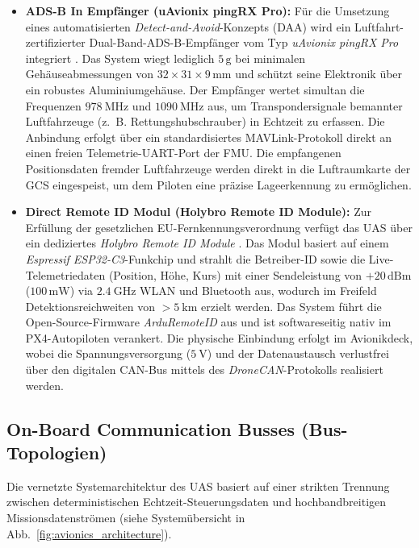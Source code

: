\begin{itemize}
    \item \textbf{ADS-B In Empfänger (uAvionix pingRX Pro):} Für die Umsetzung eines automatisierten \textit{Detect-and-Avoid}-Konzepts (DAA) wird ein Luftfahrt-zertifizierter Dual-Band-ADS-B-Empfänger vom Typ \textit{uAvionix pingRX Pro} 
    integriert \cite{uavionix_pingrx_pro}. Das System wiegt lediglich $5\,\text{g}$ bei minimalen Gehäuseabmessungen von $32 \times 31 \times 9\,\text{mm}$ und schützt seine Elektronik über ein robustes Aluminiumgehäuse. 
    Der Empfänger wertet simultan die Frequenzen $\SI{978}{\MHz}$ und $\SI{1090}{\MHz}$ aus, um Transpondersignale bemannter Luftfahrzeuge (z.~B. Rettungshubschrauber) in Echtzeit zu erfassen. Die Anbindung erfolgt über ein standardisiertes 
    MAVLink-Protokoll direkt an einen freien Telemetrie-UART-Port der FMU. Die empfangenen Positionsdaten fremder Luftfahrzeuge werden direkt in die Luftraumkarte der GCS eingespeist, um dem Piloten eine präzise Lageerkennung zu ermöglichen.
    
    \item \textbf{Direct Remote ID Modul (Holybro Remote ID Module):} Zur Erfüllung der gesetzlichen EU-Fernkennungsverordnung verfügt das UAS über ein dediziertes \textit{Holybro Remote ID Module} \cite{holybro_remote_id}. 
    Das Modul basiert auf einem \textit{Espressif ESP32-C3}-Funkchip und strahlt die Betreiber-ID sowie die Live-Telemetriedaten (Position, Höhe, Kurs) mit einer Sendeleistung von $+20\,\text{dBm}$ ($100\,\text{mW}$) via $\SI{2.4}{\GHz}$ 
    WLAN und Bluetooth aus, wodurch im Freifeld Detektionsreichweiten von $>\SI{5}{\km}$ erzielt werden. Das System führt die Open-Source-Firmware \textit{ArduRemoteID} aus und ist softwareseitig nativ im PX4-Autopiloten verankert. 
    Die physische Einbindung erfolgt im Avionikdeck, wobei die Spannungsversorgung ($\SI{5}{\V}$) und der Datenaustausch verlustfrei über den digitalen CAN-Bus mittels 
    des \textit{DroneCAN}-Protokolls realisiert werden.
\end{itemize}

\subsection{On-Board Communication Busses (Bus-Topologien)}
\label{sec:bus_topologies}

Die vernetzte Systemarchitektur des UAS basiert auf einer strikten Trennung zwischen deterministischen Echtzeit-Steuerungsdaten und hochbandbreitigen Missionsdatenströmen (siehe Systemübersicht in Abb.~\ref{fig:avionics_architecture}).

